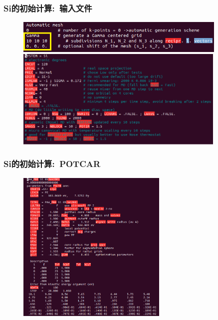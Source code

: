 \frame
{
	\frametitle{\textrm{Si}的初始计算:~输入文件}
\vspace*{-5pt}
\begin{figure}[h!]
\centering
\includegraphics[height=0.62in]{Figures/VASP_example-Si_KPOINTS-G.png}
\vskip 4pt
\includegraphics[height=1.88in]{Figures/VASP_example-Si_INCAR-dyn.png}
\label{Fig:VASP-Si_KPOINT-INCAR}
\end{figure}
}

\frame
{
	\frametitle{\textrm{Si}的初始计算:~\textrm{POTCAR}}
\vspace*{-13pt}
\begin{figure}[h!]
\centering
\includegraphics[height=2.88in]{Figures/VASP_example-Si_POTCAR.png}
\label{Fig:VASP-Si_POTCAR}
\end{figure}
}

